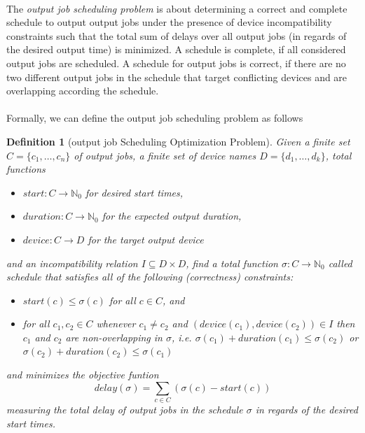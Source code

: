 \documentclass{article}
\newtheorem{mydef}{Definition}
\newcommand{\Nats}{\ensuremath{\mathbb{N}}}
\begin{document}
\paragraph{}
The {\em output job scheduling problem} is about determining a correct and complete schedule to output output jobs under the presence of device incompatibility constraints such that the total sum of delays over all output jobs (in regards of the desired output time) is minimized. A schedule is complete, if all considered output jobs are scheduled.
A schedule for output jobs is correct, if there are no two different  output jobs in the schedule that target conflicting devices and are overlapping according the schedule. 

\paragraph{}
Formally, we can define the  output job scheduling problem as follows

\begin{mydef}[{\sc output job Scheduling} Optimization Problem]
\label{def:ic-scheduling}
Given a finite  set ${C} = \{c_1, \ldots, c_n\}$ of output jobs, a finite set of  device names $D = \{d_1, \ldots, d_k\}$, total functions 
\begin{itemize}
\item[-]  ${start} : C \rightarrow \Nats_0$ for desired start times,
\item[-]   ${duration} : C \rightarrow \Nats_0$ for the expected output duration,  
\item[-]   ${device} : C \rightarrow D$ for the target output device
\end{itemize}
and an incompatibility relation $I \subseteq D \times D $, find a total function $\sigma: C \rightarrow \Nats_0$  called {\em schedule} that satisfies all of the following (correctness) constraints:
\begin{itemize}
\item[-]   ${start}(c) \leq \sigma(c)$ for all $c \in  C$, and
\item[-]  for all  $c_1, c_2 \in C$ whenever $c_1 \not= c_2$ and $({device}(c_1),{device}(c_2)) \in I$ then  $c_1$ and $c_2$ are non-overlapping in $\sigma$, i.e. $\sigma(c_1) + {duration}(c_1) \leq \sigma(c_2)$ or $\sigma(c_2) + {duration}(c_2) \leq \sigma(c_1)$
\end{itemize}
and minimizes the objective funtion \[{delay}(\sigma) = \sum_{c \in C} (\sigma(c) - {start}(c)) \]
measuring the total delay of output jobs in the schedule $\sigma$ in regards of the desired start times.

\end{mydef}
\end{document}
